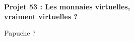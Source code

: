 
\begin{center}
    {\fontsize{50}{60}\selectfont \textbf{Projet 53 : Les monnaies virtuelles, \\ vraiment virtuelles ?}}
\end{center}

Papuche ?